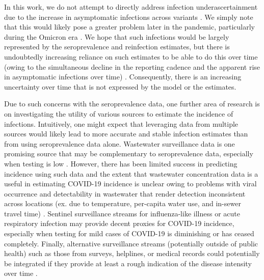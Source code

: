 \documentclass{article}
\begin{document}
In this work, we do not attempt to directly address infection underascertainment
due to the increase in asymptomatic infections across variants
\citep{pho2023covid19}. We simply note that this would likely pose a greater
problem later in the pandemic, particularly during the Omicron era
\citep{fan2022sars}. We hope that such infections would be largely represented
by the seroprevalence and reinfection estimates, but there is undoubtedly
increasing reliance on such estimates to be able to do this over time (owing to
the simultaneous decline in the reporting cadence and the apparent rise in
asymptomatic infections over time) \citep{oph2022covid, garrett2022high,
blauer2022reduce, ren2021asymptomatic}. Consequently, there is an increasing
uncertainty over time that is not expressed by the model or the estimates.   

Due to such concerns with the seroprevalence data, one further area of research
is on investigating the utility of various sources to estimate the incidence of
infections. Intuitively, one might expect that leveraging data from multiple
sources would likely lead to more accurate and stable infection estimates than
from using seroprevalence data alone. Wastewater surveillance data is one
promising source that may be complementary to seroprevalence data, especially
when testing is low \citep{mcmanus2023predicting}. However, there has been
limited success in predicting incidence using such data and the extent that
wastewater concentration data is a useful in estimating COVID-19 incidence is
unclear owing to problems with viral occurrence and detectability in wastewater
that render detection inconsistent across locations (ex. due to temperature,
per-capita water use, and in-sewer travel time) \citep{mcmanus2023predicting,
hart2020computational, li2023correlation}. Sentinel surveillance streams for
influenza-like illness or acute respiratory infection may provide decent proxies
for COVID-19 incidence, especially when testing for mild cases of COVID-19 is
diminishing or has ceased completely. Finally, alternative surveillance streams
(potentially outside of public health) such as those from surveys, helplines, or
medical records could potentially be integrated if they provide at least a rough
indication of the disease intensity over time \citep{ecdc2020strategies}.
\end{document}
